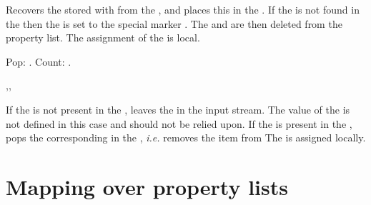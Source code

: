 \documentclass[oneside]{book}
\begin{document}
\begin{function}{\propPop}
\begin{syntax}
   
\end{syntax}
Recovers the  stored with  from the ,
and places this in the .
If the  is not found in the
 then the  is set
to the special marker .
The  and  are then deleted from the property list.
The assignment of the  is local.
\begin{demohigh}
\propSetFromKeyval {}
\propPop {} \lTmpaTl
Pop: \tlUse \lTmpaTl.
Count: \propVarCount \lTmpaProp.
\end{demohigh}
\end{function}

\begin{function}{\propPopT,\propPopF,\propPopTF}
\begin{syntax}
    
    
     
\end{syntax}
If the  is not present in the , leaves
the  in the input stream.  The value of the
 is not defined in this case and should
not be relied upon.  If the  is present in
the , pops the corresponding 
in the , \emph{i.e.} removes the item from
The  is assigned locally.
\begin{demohigh}
\propSetFromKeyval {}
\propPopTF {}  {}
\end{demohigh}
\end{function}

\section{Mapping over property lists}

\end{document}

